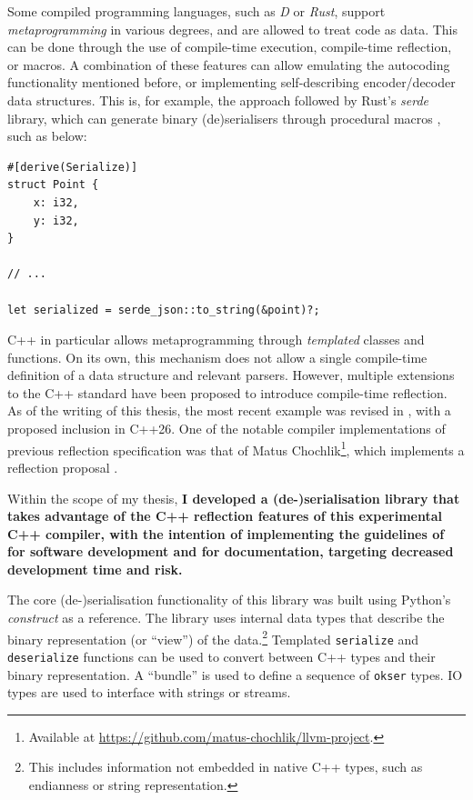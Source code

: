 \documentclass[a4paper,nobib,justified,final]{tufte-book}
\begin{document}
Some compiled programming languages, such as \emph{D} or \emph{Rust}, support \emph{metaprogramming} in various degrees, and are allowed to treat code as data. This can be done through the use of compile-time execution, compile-time reflection, or macros. A combination of these features can allow emulating the autocoding functionality mentioned before, or implementing self-describing encoder/decoder data structures. This is, for example, the approach followed by Rust's \emph{serde} library, which can generate binary (de)serialisers through procedural macros \autocite{tolnaySerdeRust2025}, such as below:
\begin{verbatim}
#[derive(Serialize)]
struct Point {
    x: i32,
    y: i32,
}

// ...

let serialized = serde_json::to_string(&point)?;
\end{verbatim}

C++ in particular allows metaprogramming through \emph{templated} classes and functions. On its own, this mechanism does not allow a single compile-time definition of a data structure and relevant parsers. However, multiple extensions to the C++ standard have been proposed to introduce compile-time reflection. As of the writing of this thesis, the most recent example was revised in , with a proposed inclusion in C++26.
One of the notable compiler implementations of previous reflection specification was that of Matus Chochlik\footnote{Available at \url{https://github.com/matus-chochlik/llvm-project}.}, which implements a \citeyear{sankelExtensionsReflection2020} reflection proposal \autocite{sankelExtensionsReflection2020}.

Within the scope of my thesis, \textbf{I developed a (de-)serialisation library that takes advantage of the C++ reflection features of this experimental C++ compiler, with the intention of implementing the guidelines of  for software development and  for documentation, targeting decreased development time and risk.}

The core (de-)serialisation functionality of this library was built using Python's \emph{construct} as a reference.
The library uses internal data types that describe the binary representation (or ``view'') of the data.\footnote{This includes information not embedded in native C++ types, such as endianness or string representation.} Templated \texttt{serialize} and \texttt{deserialize} functions can be used to convert between C++ types and their binary representation.
A ``bundle'' is used to define a sequence of \texttt{okser} types. \acs{IO} types are used to interface with strings or streams.
\end{document}
